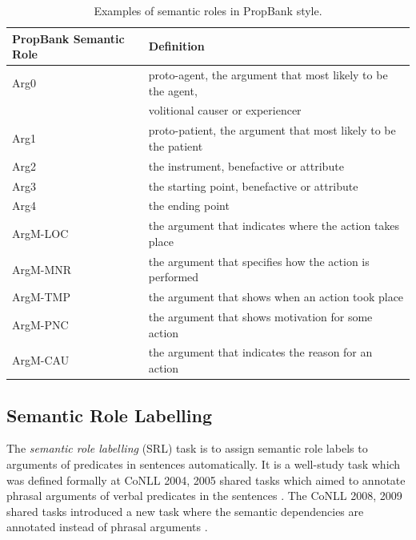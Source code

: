 \documentclass[a4paper]{article}
\begin{document}
\begin{table}[t]
\centering
\begin{tabular}{l|l} 
\hline
\textbf{PropBank Semantic Role}  &   \textbf{Definition} \\ \hline
Arg0                    &   proto-agent, the argument that most likely to be the agent, \\ 
                        &   volitional causer or experiencer \\ \hline
Arg1                    &   proto-patient, the argument that most likely to be the patient \\ \hline
Arg2                    &   the instrument, benefactive or attribute \\ \hline
Arg3                    &   the starting point, benefactive or attribute \\ \hline
Arg4                    &   the ending point \\ \hline
ArgM-LOC                &   the argument that indicates where the action takes place \\ \hline
ArgM-MNR                &   the argument that specifies how the action is performed \\ \hline
ArgM-TMP                &   the argument that shows when an action took place \\ \hline
ArgM-PNC                &   the argument that shows motivation for some action \\ \hline
ArgM-CAU                &   the argument that indicates the reason for an action \\ \hline
\end{tabular}
\caption{\label{tab:propbank} Examples of semantic roles in PropBank style.}
\end{table}
% 
% 
% 
% 
% 
%


\subsection{Semantic Role Labelling} \label{sec:srl}
The \textit{semantic role labelling} (SRL) task is to assign semantic role labels to arguments of predicates in sentences automatically. It is a well-study task which was defined formally at CoNLL 2004, 2005 shared tasks which aimed to annotate phrasal arguments of verbal predicates in the sentences \citep{carreras-marquez:2004:CONLL, carreras-marquez:2005:CoNLL}. The CoNLL 2008, 2009 shared tasks introduced a new task where the semantic dependencies are annotated instead of phrasal arguments \citep{surdeanu-EtAl:2008:CONLL, hajivc-EtAl:2009:CoNLL-2009-ST}. 
\end{document}
